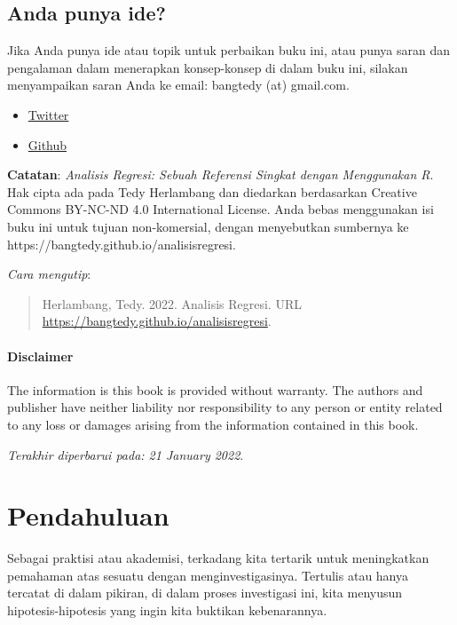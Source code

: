 \documentclass[
]{book}
\providecommand{\tightlist}{%
  \setlength{\itemsep}{0pt}\setlength{\parskip}{0pt}}
\begin{document}
\hypertarget{anda-punya-ide}{%
\section*{Anda punya ide? 📩}\label{anda-punya-ide}}

Jika Anda punya ide atau topik untuk perbaikan buku ini, atau punya saran dan pengalaman dalam menerapkan konsep-konsep di dalam buku ini, silakan menyampaikan saran Anda ke email: bangtedy (at) gmail.com.

\begin{itemize}
\tightlist
\item
  \href{https://twitter.com/t_hlb}{Twitter}
\item
  \href{https://github.com/bangtedy}{Github}
\end{itemize}

\textbf{Catatan}: \emph{Analisis Regresi: Sebuah Referensi Singkat dengan Menggunakan R}. Hak cipta ada pada Tedy Herlambang dan diedarkan berdasarkan Creative Commons BY-NC-ND 4.0 International License. Anda bebas menggunakan isi buku ini untuk tujuan non-komersial, dengan menyebutkan sumbernya ke https://bangtedy.github.io/analisisregresi.

\emph{Cara mengutip}:

\begin{quote}
Herlambang, Tedy. 2022. Analisis Regresi. URL \url{https://bangtedy.github.io/analisisregresi}.
\end{quote}

\hypertarget{disclaimer}{%
\subsubsection*{Disclaimer}\label{disclaimer}}

The information is this book is provided without warranty. The authors and publisher have neither liability nor responsibility to any person or entity related to any loss or damages arising from the information contained in this book.

\emph{Terakhir diperbarui pada: 21 January 2022}.

\hypertarget{pendahuluan}{%
\chapter{Pendahuluan}\label{pendahuluan}}

Sebagai praktisi atau akademisi, terkadang kita tertarik untuk
meningkatkan pemahaman atas sesuatu dengan menginvestigasinya. Tertulis
atau hanya tercatat di dalam pikiran, di dalam proses investigasi ini,
kita menyusun hipotesis-hipotesis yang ingin kita buktikan kebenarannya.
\end{document}
